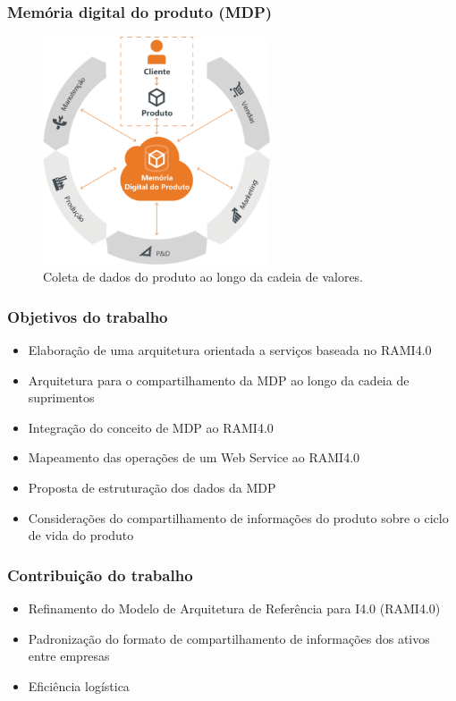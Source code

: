 \documentclass[10pt]{beamer}
\begin{document}
\begin{frame}
	\frametitle{Memória digital do produto (MDP)}

	\begin{figure}[htb]
		\centering
		\caption{Coleta de dados do produto ao longo da cadeia de valores.}
		\label{fig:mdp}
		\includegraphics[width=0.6\textwidth]{mdp.png}
	\end{figure}
	 	
\end{frame}
\begin{frame}
	\frametitle{Objetivos do trabalho}
	
	\begin{itemize}
		\item Elaboração de uma arquitetura orientada a serviços baseada no RAMI4.0
		\item Arquitetura para o compartilhamento da MDP ao longo da cadeia de suprimentos
		\item Integração do conceito de MDP ao RAMI4.0
		\item Mapeamento das operações de um Web Service ao RAMI4.0
		\item Proposta de estruturação dos dados da MDP
		\item Considerações do compartilhamento de informações do produto sobre o ciclo de vida do produto
	\end{itemize}

\end{frame}
\begin{frame}
	\frametitle{Contribuição do trabalho}
	
	\begin{itemize}
		\item Refinamento do Modelo de Arquitetura de Referência para I4.0 (RAMI4.0)
		\item Padronização do formato de compartilhamento de informações dos ativos entre empresas
		\item Eficiência logística
	\end{itemize}
	
\end{frame}
\end{document}
